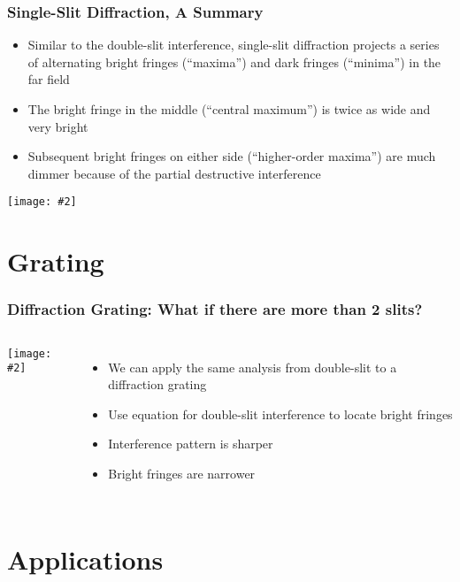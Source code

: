 \documentclass[compress,aspectratio=169]{beamer}
\newcommand{\pic}[2]{\texttt{[image: \#2]}}
\begin{document}
\begin{frame}
  \frametitle{Single-Slit Diffraction, A Summary}
  \begin{itemize}
  \item Similar to the double-slit interference, single-slit diffraction
    projects a series of alternating bright fringes (``maxima'') and dark
    fringes (``minima'') in the far field
  \item The bright fringe in the middle (``central maximum'') is twice as wide
    and very bright
  \item Subsequent bright fringes on either side (``higher-order maxima'') are
    much dimmer because of the partial destructive interference
  \end{itemize}
  \begin{center}
    \pic{.65}{Single_Slit_Diffraction.png}
  \end{center}
\end{frame}

\section{Grating}
\begin{frame}
  \frametitle{Diffraction Grating: What if there are more than 2 slits?}
  \begin{columns}
    \pic{1}{grating1.jpg}
    \begin{itemize}
    \item We can apply the same analysis from double-slit to a diffraction
      grating
    \item Use equation for double-slit interference to locate bright fringes
      
      \vspace{-.2in}{\Large
        \begin{displaymath}
          n\lambda=d\sin\theta_n
        \end{displaymath}
      }
    \item Interference pattern is sharper
    \item Bright fringes are narrower
    \end{itemize}
  \end{columns}
\end{frame}

\section{Applications}
\end{document}
